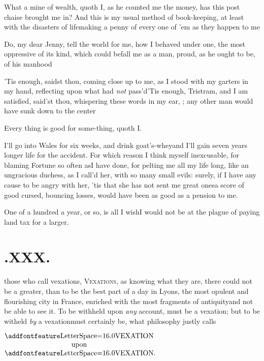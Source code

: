 \documentclass{article}
\begin{document}
\tsh What a mine of wealth, quoth I, as\break
he counted me the money, has this post chaise brought me in? And
this is my usual method of book-keeping, at least with the
disasters of life\tsk making a penny of every one of ’em as they
happen to me\tsh

\tsh Do, my dear Jenny, tell the world for me,
how I behaved under one, the most oppressive of its kind, which
could befall me as a man, proud, as he ought to be, of his
manhood\tsh

’Tis enough, saidst thou, coming close up to me, as I
stood with my garters in my hand, reflecting upon what had \textit{not}
pass’d\tsh ’Tis enough, Tristram, and I
am satisfied, said’st thou, whispering these\break
words in my ear,   \break
{} ;\tsk{}  
\tsh any other man would have sunk down
to the center\tsh

\tsh Every thing is good for some-\break thing, quoth I.

\tsh I’ll go into Wales for six weeks, and drink goat’s-whey\tsk and I’ll gain seven
years longer life for the accident. For which reason I think myself inexcusable, for
blaming Fortune so often as\break I have done, for pelting me all my life long, like an
ungracious duchess, as I call’d her, with so many small evils: surely, if I have any
cause to be angry with her, ’tis that she has not sent me great ones\tsk a score of
good cursed, bouncing losses, would have been as good as a pension to me.

\tsh One of a hundred a year, or so, is all I wish\tsk I would not be at the plague of
paying land tax for a larger.

\section{.\enspace XXX.}

 those who call vexations,\break
\textsc{Vexations}, as knowing what\break
they are, there could not be a greater,\break
than to be the best part of a day in Lyons, the most
opulent and flourishing city in France, enriched with the most fragments of
antiquity\tsk and not be able to see it. To be withheld upon \textit{any} account,
must be a vexation; but to be witheld \textit{by} a
vexation\tsh must certainly\break
be, what philosophy justly calls

\medskip
\centerline{$\vcenter{\halign{\hss # \hss\cr
\lss{VEXATION}\cr
upon\cr
\lss{VEXATION}\rlap{.}\cr}}$}
\eject
\end{document}
